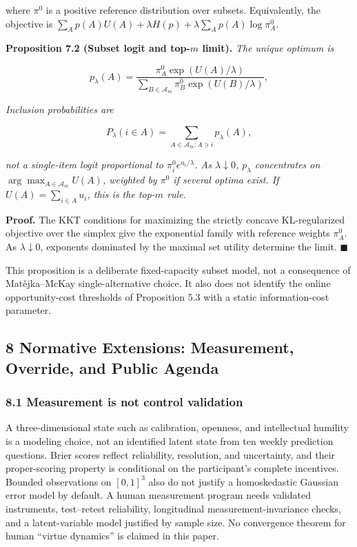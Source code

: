 \documentclass[
  11pt]{article}
\begin{document}
where \(\pi^0\) is a positive reference distribution over subsets.
Equivalently, the objective is
\(\sum_Ap(A)U(A)+\lambda H(p)+\lambda\sum_Ap(A)\log\pi_A^0\).

\textbf{Proposition 7.2 (Subset logit and top-\(m\) limit).} \emph{The
unique optimum is}

\[p_\lambda(A)=\frac{\pi^0_A\exp(U(A)/\lambda)}{\sum_{B\in\mathcal A_m}\pi^0_B\exp(U(B)/\lambda)},\]

\emph{Inclusion probabilities are}

\[P_\lambda(i\in A)=\sum_{A\in\mathcal A_m:A\ni i}p_\lambda(A),\]

\emph{not a single-item logit proportional to
\(\pi_i^0e^{u_i/\lambda}\). As \(\lambda\downarrow0\), \(p_\lambda\)
concentrates on \(\arg\max_{A\in\mathcal A_m}U(A)\), weighted by
\(\pi^0\) if several optima exist. If \(U(A)=\sum_{i\in A}u_i\), this is
the top-\(m\) rule.}

\textbf{Proof.} The KKT conditions for maximizing the strictly concave
KL-regularized objective over the simplex give the exponential family
with reference weights \(\pi_A^0\). As \(\lambda\downarrow0\), exponents
dominated by the maximal set utility determine the limit.
\(\blacksquare\)

This proposition is a deliberate fixed-capacity subset model, not a
consequence of Matějka--McKay single-alternative choice. It also does
not identify the online opportunity-cost thresholds of Proposition 5.3
with a static information-cost parameter.

\subsection{8 Normative Extensions: Measurement, Override, and Public
Agenda}\label{normative-extensions-measurement-override-and-public-agenda}

\subsubsection{8.1 Measurement is not control
validation}\label{measurement-is-not-control-validation}

A three-dimensional state such as calibration, openness, and
intellectual humility is a modeling choice, not an identified latent
state from ten weekly prediction questions. Brier scores reflect
reliability, resolution, and uncertainty, and their proper-scoring
property is conditional on the participant's complete incentives.
Bounded observations on \([0,1]^3\) also do not justify a homoskedastic
Gaussian error model by default. A human measurement program needs
validated instruments, test--retest reliability, longitudinal
measurement-invariance checks, and a latent-variable model justified by
sample size. No convergence theorem for human ``virtue dynamics'' is
claimed in this paper.
\end{document}

